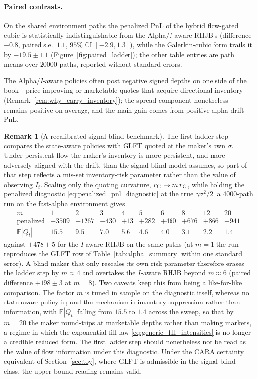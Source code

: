 \documentclass[11pt,a4paper]{article}
\newcommand{\E}{\mathbb{E}}
\theoremstyle{plain}
\theoremstyle{definition}
\newtheorem{remark}{Remark}[section]
\begin{document}
\paragraph{Paired contrasts.}
On the shared environment paths the penalized PnL of the hybrid flow-gated
cubic is statistically indistinguishable from the Alpha/\(I\)-aware RHJB's
(difference \(-0.8\), paired s.e.\ \(1.1\), \(95\%\) CI \([-2.9,1.3]\)), while
the Galerkin-cubic form trails it by \(-19.5\pm1.1\)
(Figure~\ref{fig:paired_ladder}); the other table entries
are path means over \(20000\) paths, reported without standard errors.

The Alpha/\(I\)-aware policies often post negative signed depths on one side
of the book---price-improving or marketable quotes that acquire directional
inventory (Remark~\ref{rem:why_carry_inventory}); the spread component
nonetheless remains positive on average, and the main gain comes from positive
alpha-drift PnL.

\begin{remark}[A recalibrated signal-blind benchmark]
\label{rem:blind_recalibration}
The first ladder step compares the state-aware policies with GLFT quoted at the
maker's own \(\sigma\).  Under persistent flow the maker's inventory is more
persistent, and more adversely aligned with the drift, than the signal-blind
model assumes, so part of that step reflects a mis-set inventory-risk parameter
rather than the value of observing \(I_t\).  Scaling only the quoting curvature,
\(r_{\rm G}\to m\,r_{\rm G}\), while holding the penalized diagnostic
\eqref{eq:penalized_pnl_diagnostic} at the true \(\gamma\sigma^2/2\), a
\(4000\)-path run on the fast-alpha environment gives
\[
\begin{array}{l|rrrrrrrrr}
m & 1 & 2 & 3 & 4 & 5 & 6 & 8 & 12 & 20\\\hline
\text{penalized} & -3509 & -1267 & -430 & +13 & +282 & +460 & +676 & +866 & +941\\
\E|Q_t| & 15.5 & 9.5 & 7.0 & 5.6 & 4.6 & 4.0 & 3.1 & 2.2 & 1.4
\end{array}
\]
against \(+478\pm5\) for the \(I\)-aware RHJB on the same paths (at \(m=1\) the
run reproduces the GLFT row of Table~\ref{tab:alpha_summary} within one standard
error).  A blind maker that only rescales its own risk parameter therefore
erases the ladder step by \(m\approx4\) and overtakes the \(I\)-aware RHJB
beyond \(m\approx6\) (paired difference \(+198\pm3\) at \(m=8\)).  Two caveats
keep this from being a like-for-like comparison.  The factor \(m\) is tuned in
sample on the diagnostic itself, whereas no state-aware policy is; and the
mechanism is inventory suppression rather than information, with \(\E|Q_t|\)
falling from \(15.5\) to \(1.4\) across the sweep, so that by \(m=20\) the maker
round-trips at marketable depths rather than making markets, a regime in which
the exponential fill law \eqref{eq:generic_fill_intensities} is no longer a
credible reduced form.  The first ladder step should nonetheless not be read as
the value of flow information under this diagnostic.  Under the CARA certainty
equivalent of Section~\ref{sec:toy}, where GLFT is admissible in the
signal-blind class, the upper-bound reading remains valid.
\end{remark}
\end{document}

